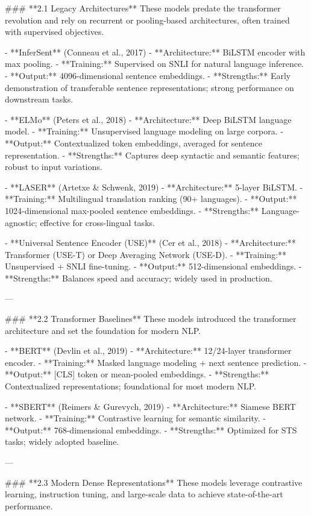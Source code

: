 ### **2.1 Legacy Architectures**
These models predate the transformer revolution and rely on recurrent or pooling-based architectures, often trained with supervised objectives.

- **InferSent** (Conneau et al., 2017)
  - **Architecture:** BiLSTM encoder with max pooling.
  - **Training:** Supervised on SNLI for natural language inference.
  - **Output:** 4096-dimensional sentence embeddings.
  - **Strengths:** Early demonstration of transferable sentence representations; strong performance on downstream tasks.

- **ELMo** (Peters et al., 2018)
  - **Architecture:** Deep BiLSTM language model.
  - **Training:** Unsupervised language modeling on large corpora.
  - **Output:** Contextualized token embeddings, averaged for sentence representation.
  - **Strengths:** Captures deep syntactic and semantic features; robust to input variations.

- **LASER** (Artetxe & Schwenk, 2019)
  - **Architecture:** 5-layer BiLSTM.
  - **Training:** Multilingual translation ranking (90+ languages).
  - **Output:** 1024-dimensional max-pooled sentence embeddings.
  - **Strengths:** Language-agnostic; effective for cross-lingual tasks.

- **Universal Sentence Encoder (USE)** (Cer et al., 2018)
  - **Architecture:** Transformer (USE-T) or Deep Averaging Network (USE-D).
  - **Training:** Unsupervised + SNLI fine-tuning.
  - **Output:** 512-dimensional embeddings.
  - **Strengths:** Balances speed and accuracy; widely used in production.

---

### **2.2 Transformer Baselines**
These models introduced the transformer architecture and set the foundation for modern NLP.

- **BERT** (Devlin et al., 2019)
  - **Architecture:** 12/24-layer transformer encoder.
  - **Training:** Masked language modeling + next sentence prediction.
  - **Output:** [CLS] token or mean-pooled embeddings.
  - **Strengths:** Contextualized representations; foundational for most modern NLP.

- **SBERT** (Reimers & Gurevych, 2019)
  - **Architecture:** Siamese BERT network.
  - **Training:** Contrastive learning for semantic similarity.
  - **Output:** 768-dimensional embeddings.
  - **Strengths:** Optimized for STS tasks; widely adopted baseline.

---

### **2.3 Modern Dense Representations**
These models leverage contrastive learning, instruction tuning, and large-scale data to achieve state-of-the-art performance.

